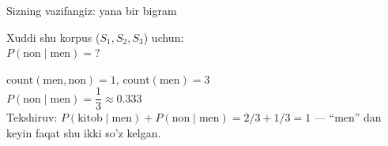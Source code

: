 \documentclass[aspectratio=169,11pt]{beamer}
\begin{document}
\begin{frame}{Sizning vazifangiz: yana bir bigram}
  \begin{tcolorbox}[warnbox,title=Savol --- 90 soniya]
    \small
    Xuddi shu korpus ($S_1,S_2,S_3$) uchun:\\[4pt]
    \textbf{\large $P(\text{non}\mid\text{men}) = ?$}
  \end{tcolorbox}
  \pause
  \begin{tcolorbox}[okbox,title=Javob]
    \small
    $\text{count}(\text{men},\text{non}) = 1$, \quad $\text{count}(\text{men}) = 3$\\[3pt]
    $P(\text{non}\mid\text{men}) = \dfrac{1}{3} \approx \mathbf{0.333}$\\[3pt]
    \footnotesize Tekshiruv: $P(\text{kitob}{\mid}\text{men}) + P(\text{non}{\mid}\text{men})
    = 2/3 + 1/3 = 1$ --- ``men'' dan keyin faqat shu ikki so'z kelgan.
  \end{tcolorbox}
\end{frame}
\end{document}
